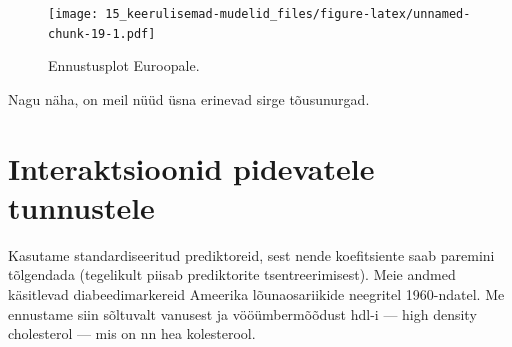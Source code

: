 \documentclass[]{book}
\newenvironment{Shaded}{\begin{snugshade}}{\end{snugshade}}
\newcommand{\DataTypeTok}[1]{\textcolor[rgb]{0.13,0.29,0.53}{#1}}
\newcommand{\KeywordTok}[1]{\textcolor[rgb]{0.13,0.29,0.53}{\textbf{#1}}}
\newcommand{\NormalTok}[1]{#1}
\newcommand{\OperatorTok}[1]{\textcolor[rgb]{0.81,0.36,0.00}{\textbf{#1}}}
\newcommand{\StringTok}[1]{\textcolor[rgb]{0.31,0.60,0.02}{#1}}
\begin{document}
\begin{figure}
\centering
\texttt{[image: 15\_keerulisemad-mudelid\_files/figure-latex/unnamed-chunk-19-1.pdf]}
\caption{\label{fig:unnamed-chunk-19}Ennustusplot Euroopale.}
\end{figure}

Nagu näha, on meil nüüd üsna erinevad sirge tõusunurgad.

\hypertarget{interaktsioonid-pidevatele-tunnustele}{%
\section*{Interaktsioonid pidevatele tunnustele}\label{interaktsioonid-pidevatele-tunnustele}}

Kasutame standardiseeritud prediktoreid, sest nende koefitsiente saab paremini tõlgendada (tegelikult piisab prediktorite tsentreerimisest). Meie andmed käsitlevad diabeedimarkereid Ameerika lõunaosariikide neegritel 1960-ndatel. Me ennustame siin sõltuvalt vanusest ja vööümbermõõdust hdl-i --- high density cholesterol --- mis on nn hea kolesterool.

\begin{Shaded}
\end{Shaded}
\end{document}
